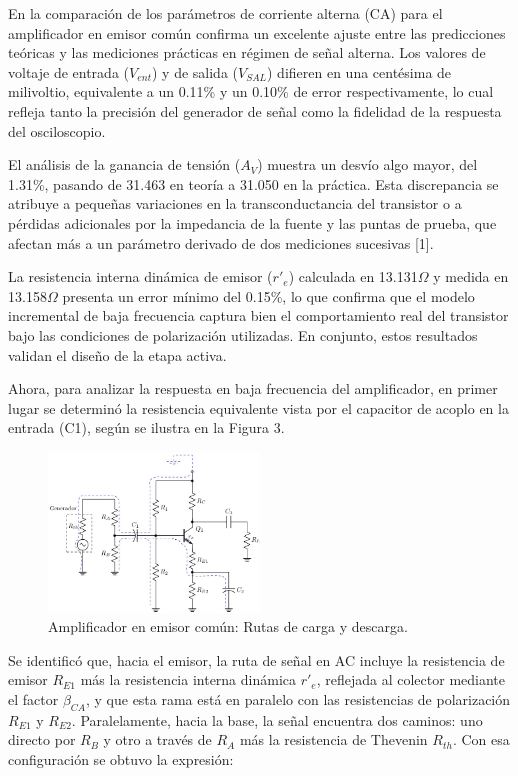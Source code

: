 \documentclass[journal]{IEEEtran}
\begin{document}
\par En la comparación de los parámetros de corriente alterna (CA) para el amplificador en emisor común confirma un excelente ajuste entre las predicciones teóricas y las mediciones prácticas en régimen de señal alterna. Los valores de voltaje de entrada (\( V_{ent}\)) y de salida (\( V_{SAL} \)) difieren en una centésima de milivoltio, equivalente a un 0.11\% y un 0.10\% de error respectivamente, lo cual refleja tanto la precisión del generador de señal como la fidelidad de la respuesta del osciloscopio. 
\par El análisis de la ganancia de tensión (\( A_V \)) muestra un desvío algo mayor, del 1.31\%, pasando de 31.463 en teoría a 31.050 en la práctica. Esta discrepancia se atribuye a pequeñas variaciones en la transconductancia del transistor o a pérdidas adicionales por la impedancia de la fuente y las puntas de prueba, que afectan más a un parámetro derivado de dos mediciones sucesivas [1].
\par La resistencia interna dinámica de emisor (\( r'_e \)) calculada en 13.131$\Omega$ y medida en 13.158$\Omega$ presenta un error mínimo del 0.15\%, lo que confirma que el modelo incremental de baja frecuencia captura bien el comportamiento real del transistor bajo las condiciones de polarización utilizadas. En conjunto, estos resultados validan el diseño de la etapa activa. 
\par Ahora, para analizar la respuesta en baja frecuencia del amplificador, en primer lugar se determinó la resistencia equivalente vista por el capacitor de acoplo en la entrada (C1), según se ilustra en la Figura 3.
\begin{figure}[H]
    \centering
    \includegraphics[width=0.5\textwidth]{rutas_carga_descarga.png}
    \caption{Amplificador en emisor común: Rutas de carga y descarga.}
    \label{fig:rutas_carga_descarga}
\end{figure}
\par Se identificó que, hacia el emisor, la ruta de señal en AC incluye la resistencia de emisor \( R_{E1} \) más la resistencia interna dinámica \( r'_e \), reflejada al colector mediante el factor $\beta_{CA}$, y que esta rama está en paralelo con las resistencias de polarización \( R_{E1} \) y \( R_{E2} \). Paralelamente, hacia la base, la señal encuentra dos caminos: uno directo por \( R_B \) y otro a través de \( R_A \) más la resistencia de Thevenin \( R_{th} \). Con esa configuración se obtuvo la expresión:
\end{document}
